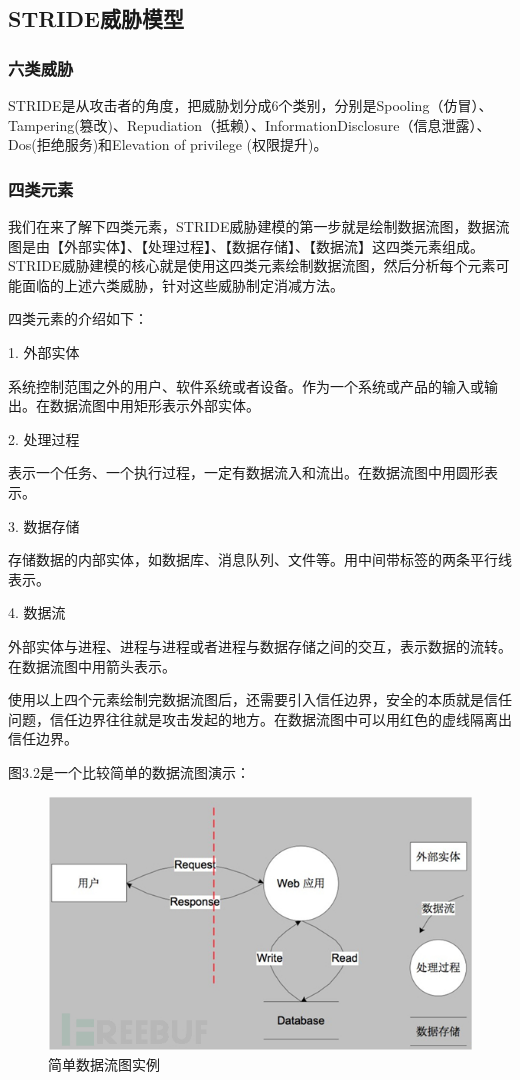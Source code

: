 \subsection{STRIDE威胁模型}
\subsubsection{六类威胁}

STRIDE是从攻击者的角度，把威胁划分成6个类别，分别是Spooling（仿冒）、Tampering(篡改)、Repudiation（抵赖）、InformationDisclosure（信息泄露）、Dos(拒绝服务)和Elevation of privilege (权限提升)。

\subsubsection{四类元素}

我们在来了解下四类元素，STRIDE威胁建模的第一步就是绘制数据流图，数据流图是由【外部实体】、【处理过程】、【数据存储】、【数据流】这四类元素组成。
STRIDE威胁建模的核心就是使用这四类元素绘制数据流图，然后分析每个元素可能面临的上述六类威胁，针对这些威胁制定消减方法。

四类元素的介绍如下：

1.  外部实体

系统控制范围之外的用户、软件系统或者设备。作为一个系统或产品的输入或输出。在数据流图中用矩形表示外部实体。

2.  处理过程

表示一个任务、一个执行过程，一定有数据流入和流出。在数据流图中用圆形表示。

3.  数据存储

存储数据的内部实体，如数据库、消息队列、文件等。用中间带标签的两条平行线表示。

4.  数据流

外部实体与进程、进程与进程或者进程与数据存储之间的交互，表示数据的流转。在数据流图中用箭头表示。

使用以上四个元素绘制完数据流图后，还需要引入信任边界，安全的本质就是信任问题，信任边界往往就是攻击发起的地方。在数据流图中可以用红色的虚线隔离出信任边界。

图3.2是一个比较简单的数据流图演示：
\begin{figure}
    \centering
    \includegraphics[scale=0.6]{resources/img/i5.png}
    \caption{简单数据流图实例}
  \end{figure}


